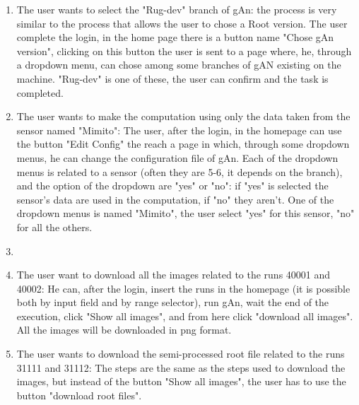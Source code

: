 \begin{enumerate}
\item The user wants to select the "Rug-dev" branch of gAn:
the process is very similar to the process that allows the user to chose a Root version. The user complete the login, in the home page there is a button name "Chose gAn version", clicking on this button the user is sent to a page where, he, through a dropdown menu, can chose among some branches of gAN existing on the machine. "Rug-dev" is one of these, the user can confirm and the task is completed.

\item The user wants to make the computation using only the data taken from the sensor named "Mimito":
The user, after the login, in the homepage can use the button "Edit Config" the reach a page in which, through some dropdown menus, he can change the configuration file of gAn. Each of the dropdown menus is related to a sensor (often they are 5-6, it depends on the branch), and the option of the dropdown are "yes" or "no": if "yes" is selected the sensor's data are used in the computation, if "no" they aren't. One of the dropdown menus is named "Mimito", the user select "yes" for this sensor, "no" for all the others.  

\item %

\item The user want to download all the images related to the runs 40001 and 40002:
He can, after the login, insert the runs in the homepage (it is possible both by input field and by range selector), run gAn, wait the end of the execution, click "Show all images", and from here click "download all images". All the images will be downloaded in png format. %

\item The user wants to download the semi-processed root file related to the runs 31111 and 31112:
The steps are the same as the steps used to download the images, but instead of the button "Show all images", the user has to use the button "download root files".     

\end{enumerate}  

